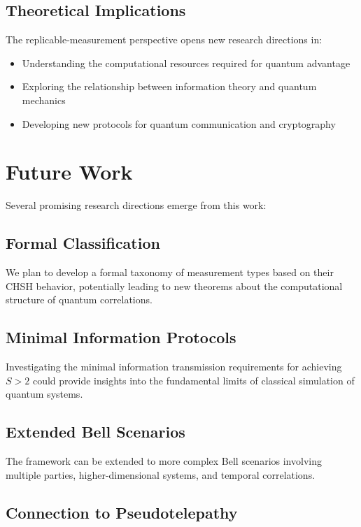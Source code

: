 \documentclass[11pt,a4paper]{article}
\begin{document}
\subsection{Theoretical Implications}

The replicable-measurement perspective opens new research directions in:

\begin{itemize}
\item Understanding the computational resources required for quantum advantage
\item Exploring the relationship between information theory and quantum mechanics
\item Developing new protocols for quantum communication and cryptography
\end{itemize}

\section{Future Work}

Several promising research directions emerge from this work:

\subsection{Formal Classification}

We plan to develop a formal taxonomy of measurement types based on their CHSH behavior, potentially leading to new theorems about the computational structure of quantum correlations.

\subsection{Minimal Information Protocols}

Investigating the minimal information transmission requirements for achieving $S > 2$ could provide insights into the fundamental limits of classical simulation of quantum systems.

\subsection{Extended Bell Scenarios}

The framework can be extended to more complex Bell scenarios involving multiple parties, higher-dimensional systems, and temporal correlations.

\subsection{Connection to Pseudotelepathy}
\end{document}
